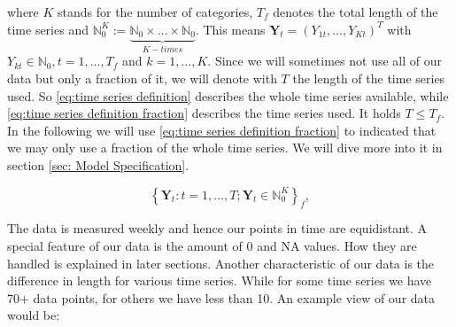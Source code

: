 where $K$ stands for the number of categories, $T_f$ denotes the total length of the time series and $\mathbb{N}_0^K := \underbrace{\mathbb{N}_0 \times \ldots \times \mathbb{N}_0}_{K-times}$. This means $\bm{Y}_t = (Y_{1t},\ldots,Y_{Kt})^T$ with $Y_{kt} \in \mathbb{N}_0, t=1,\ldots,T_f$ and $k=1,\ldots,K$. Since we will sometimes not use all of our data but only a fraction of it, we will denote with $T$ the length of the time series used. So \ref{eq:time series definition} describes the whole time series available, while \ref{eq:time series definition fraction} describes the time series used. It holds $T\leq T_f$. In the following we will use \ref{eq:time series definition fraction} to indicated that we may only use a fraction of the whole time series. We will dive more into it in section \ref{sec: Model Specification}.

\begin{equation}
\left\{\bm{Y}_t:t=1,\ldots,T; \bm{Y}_t \in \mathbb{N}_0^K \right\}_f,
\label{eq:time series definition fraction}
\end{equation}

The data is measured weekly and hence our points in time are equidistant. A special feature of our data is the amount of 0 and NA values. How they are handled is explained in later sections. Another characteristic of our data is the difference in length for various time series. While for some time series we have 70+ data points, for others we have less than 10. An example view of our data would be: 

